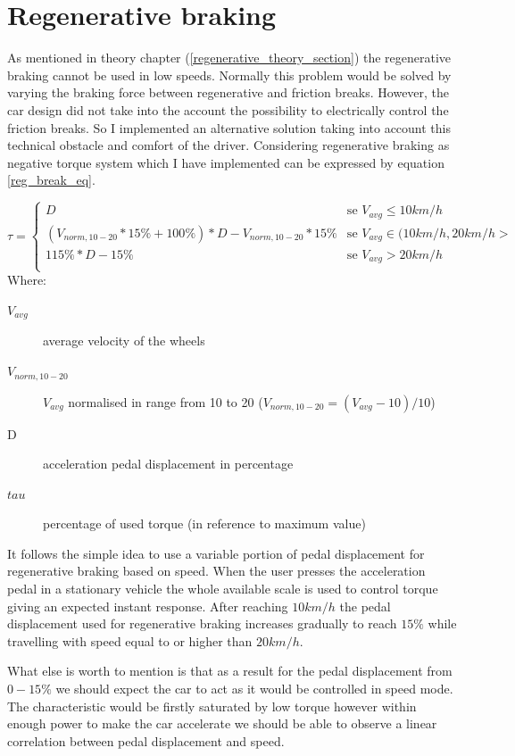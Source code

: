 \section{Regenerative braking}
As mentioned in theory chapter (\ref{regenerative_theory_section}) the regenerative braking cannot be used in low speeds. Normally this problem would be solved by varying the braking force between regenerative and friction breaks. However, the car design did not take into the account the possibility to electrically control the friction breaks. So I implemented an alternative solution taking into account this technical obstacle and comfort of the driver.
Considering regenerative braking as negative torque system which I have implemented can be expressed by equation \ref{reg_break_eq}.


\begin{equation*}
    \tau = \begin{cases}
        D & \text{se $V_{avg} \leq 10km/h$}\\
        (V_{norm,10-20} * 15\% + 100\%) * D - V_{norm,10-20} * 15\% & \text{se $V_{avg} \in (10km/h,20km/h>$}\\
        115\% * D - 15\% & \text{se $V_{avg} > 20km/h$}\\
    \end{cases}
    \label{reg_break_eq}
\end{equation*}
Where:
\begin{description}
    \item[$V_{avg}$] average velocity of the wheels 
    \item[$V_{norm,10-20}$] $V_{avg}$ normalised in range from 10 to 20 ($V_{norm,10-20}=(V_{avg}-10)/10$)
    \item[D] acceleration pedal displacement in percentage
    \item[$tau$] percentage of used torque (in reference to maximum value)
\end{description}

It follows the simple idea to use a variable portion of pedal displacement for regenerative braking based on speed.
When the user presses the acceleration pedal in a stationary vehicle the whole available scale is used to control torque giving an expected instant response. After reaching $10km/h$ the pedal displacement used for regenerative braking increases gradually to reach $15\%$ while travelling with speed equal to or higher than $20km/h$.

What else is worth to mention is that as a result for the pedal displacement from $0-15\%$ we should expect the car to act as it would be controlled in speed mode.\label{speed_mode} The characteristic would be firstly saturated by low torque however within enough power to make the car accelerate we should be able to observe a linear correlation between pedal displacement and speed.

